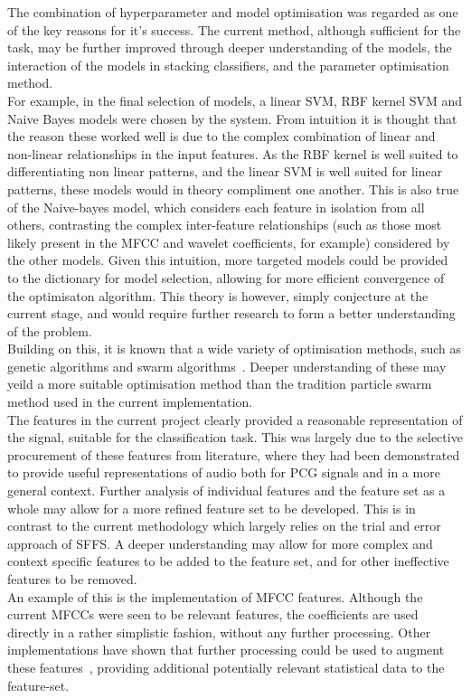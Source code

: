 \documentclass[titlepage, 12pt]{scrartcl} \usepackage{enumitem}
\begin{document}
The combination of hyperparameter and model optimisation was regarded as one of
the key reasons for it's success. The current method, although sufficient for
the task, may be further improved through deeper understanding of the models,
the interaction of the models in stacking classifiers, and the parameter
optimisation method.\\
For example, in the final selection of models, a linear SVM, RBF kernel SVM and
Naive Bayes models were chosen by the system. From intuition it is thought that
the reason these worked well is due to the complex combination of linear and
non-linear relationships in the input features. As the RBF kernel is well
suited to differentiating non linear patterns, and the linear SVM is well suited
for linear patterns, these models would in theory compliment one another. This
is also true of the Naive-bayes model, which considers each feature in
isolation from all others, contrasting the complex inter-feature relationships
(such as those most likely present in the MFCC and wavelet coefficients, for
example) considered by the other models. Given this intuition, more targeted
models could be provided to the dictionary for model selection, allowing for
more efficient convergence of the optimisaton algorithm. This theory is
however, simply conjecture at the current stage, and would require further
research to form a better understanding of the problem.\\
Building on this, it is known that a wide variety of optimisation methods, such
as genetic algorithms and swarm algorithms~\parencite[p.32]{Sesmero2015}.
Deeper understanding of these may yeild a more suitable optimisation method
than the tradition particle swarm method used in the current implementation.\\

The features in the current project clearly provided a reasonable
representation of the signal, suitable for the classification task. This was
largely due to the selective procurement of these features from literature,
where they had been demonstrated to provide useful representations of audio
both for PCG signals and in a more general context. Further analysis of
individual features and the feature set as a whole may allow for a more refined
feature set to be developed. This is in contrast to the current methodology
which largely relies on the trial and error approach of SFFS. A deeper
understanding may allow for more complex and context specific features to be
added to the feature set, and for other ineffective features to be removed.\\ An
example of this is the implementation of MFCC features. Although the current
MFCCs were seen to be relevant features, the coefficients are used directly in
a rather simplistic fashion, without any further processing. Other
implementations have shown that further processing could be used to augment
these features~\parencite{Zabihi2016}, providing additional potentially relevant
statistical data to the feature-set.\\
\end{document}

